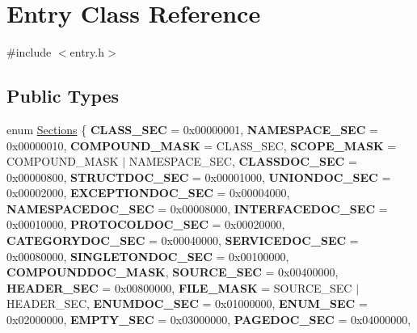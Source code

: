 \hypertarget{class_entry}{}\section{Entry Class Reference}
\label{class_entry}


{\ttfamily \#include $<$entry.\+h$>$}

\subsection*{Public Types}
\begin{DoxyCompactItemize}
\item 
enum \mbox{\hyperlink{class_entry_a1e615d53eb7db6d16c19fcb5788fbd9e}{Sections}} \{ \newline
{\bfseries C\+L\+A\+S\+S\+\_\+\+S\+EC} = 0x00000001, 
{\bfseries N\+A\+M\+E\+S\+P\+A\+C\+E\+\_\+\+S\+EC} = 0x00000010, 
{\bfseries C\+O\+M\+P\+O\+U\+N\+D\+\_\+\+M\+A\+SK} = C\+L\+A\+S\+S\+\_\+\+S\+EC, 
{\bfseries S\+C\+O\+P\+E\+\_\+\+M\+A\+SK} = C\+O\+M\+P\+O\+U\+N\+D\+\_\+\+M\+A\+SK $\vert$ N\+A\+M\+E\+S\+P\+A\+C\+E\+\_\+\+S\+EC, 
\newline
{\bfseries C\+L\+A\+S\+S\+D\+O\+C\+\_\+\+S\+EC} = 0x00000800, 
{\bfseries S\+T\+R\+U\+C\+T\+D\+O\+C\+\_\+\+S\+EC} = 0x00001000, 
{\bfseries U\+N\+I\+O\+N\+D\+O\+C\+\_\+\+S\+EC} = 0x00002000, 
{\bfseries E\+X\+C\+E\+P\+T\+I\+O\+N\+D\+O\+C\+\_\+\+S\+EC} = 0x00004000, 
\newline
{\bfseries N\+A\+M\+E\+S\+P\+A\+C\+E\+D\+O\+C\+\_\+\+S\+EC} = 0x00008000, 
{\bfseries I\+N\+T\+E\+R\+F\+A\+C\+E\+D\+O\+C\+\_\+\+S\+EC} = 0x00010000, 
{\bfseries P\+R\+O\+T\+O\+C\+O\+L\+D\+O\+C\+\_\+\+S\+EC} = 0x00020000, 
{\bfseries C\+A\+T\+E\+G\+O\+R\+Y\+D\+O\+C\+\_\+\+S\+EC} = 0x00040000, 
\newline
{\bfseries S\+E\+R\+V\+I\+C\+E\+D\+O\+C\+\_\+\+S\+EC} = 0x00080000, 
{\bfseries S\+I\+N\+G\+L\+E\+T\+O\+N\+D\+O\+C\+\_\+\+S\+EC} = 0x00100000, 
{\bfseries C\+O\+M\+P\+O\+U\+N\+D\+D\+O\+C\+\_\+\+M\+A\+SK}, 
{\bfseries S\+O\+U\+R\+C\+E\+\_\+\+S\+EC} = 0x00400000, 
\newline
{\bfseries H\+E\+A\+D\+E\+R\+\_\+\+S\+EC} = 0x00800000, 
{\bfseries F\+I\+L\+E\+\_\+\+M\+A\+SK} = S\+O\+U\+R\+C\+E\+\_\+\+S\+EC $\vert$ H\+E\+A\+D\+E\+R\+\_\+\+S\+EC, 
{\bfseries E\+N\+U\+M\+D\+O\+C\+\_\+\+S\+EC} = 0x01000000, 
{\bfseries E\+N\+U\+M\+\_\+\+S\+EC} = 0x02000000, 
\newline
{\bfseries E\+M\+P\+T\+Y\+\_\+\+S\+EC} = 0x03000000, 
{\bfseries P\+A\+G\+E\+D\+O\+C\+\_\+\+S\+EC} = 0x04000000, 

\end{DoxyCompactItemize}
